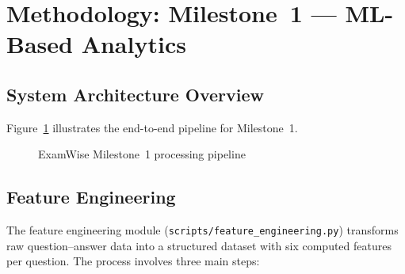 \documentclass[12pt, a4paper]{article}
\begin{document}
\section{Methodology: Milestone~1 --- ML-Based Analytics}
\label{sec:methodology-m1}

\subsection{System Architecture Overview}

Figure~\ref{fig:pipeline} illustrates the end-to-end pipeline for Milestone~1.

\begin{figure}[H]
\centering
{}
\caption{ExamWise Milestone~1 processing pipeline}
\label{fig:pipeline}
\end{figure}

\subsection{Feature Engineering}
\label{sec:feature-eng}

The feature engineering module (\texttt{scripts/feature\_engineering.py}) transforms raw question--answer data into a structured dataset with six computed features per question. The process involves three main steps:
\end{document}
